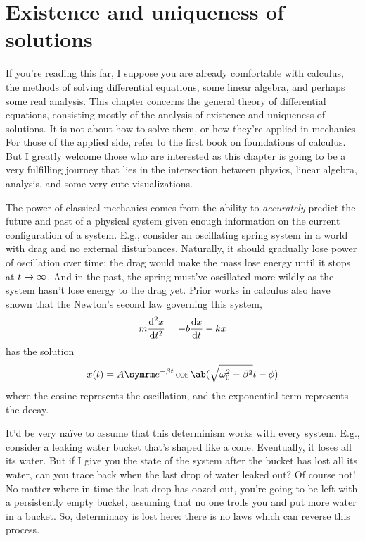 \chapter{Existence and uniqueness of solutions}


If you're reading this far, I suppose you are already comfortable with calculus, the
methods of solving differential equations, some linear algebra, and perhaps some
real analysis. This chapter concerns the general theory of differential equations,
consisting mostly of the analysis of existence and uniqueness of solutions. It is not
about how to solve them, or how they're applied in mechanics. For those of the applied
side, refer to the first book on foundations of calculus. But I greatly welcome those
who are interested as this chapter is going to be a very fulfilling journey that lies
in the intersection between physics, linear algebra, analysis, and some very cute visualizations.

The power of classical mechanics comes from the ability to \emph{accurately} predict the
future and past of a physical system given enough information on the current configuration
of a system. E.g., consider an oscillating spring system in a world with drag and no external
disturbances. Naturally, it should gradually lose power of oscillation over time; the
drag would make the mass lose energy until it stops at \(t \rightarrow \infty\). And in the
past, the spring must've oscillated more wildly as the system hasn't lose energy to the drag
yet. Prior works in calculus also have shown that the Newton's second law governing this system,
\begin{equation}
  m \odv[ord = 2]{x}{t} = - b \odv{x}{t} - kx
\end{equation}
has the solution
\begin{equation}
  x(t) = A \e^{-\beta t} \cos\ab(\sqrt{\omega_0^2 - \beta^2} t - \phi)
\end{equation}
where the cosine represents the oscillation, and the exponential term represents the decay.

It'd be very na\"ive to assume that this determinism works with every system. E.g., consider
a leaking water bucket that's shaped like a cone. Eventually, it loses all its water.
But if I give you the state of the system after the bucket has lost all its water, can
you trace back when the last drop of water leaked out? Of course not! No matter where
in time the last drop has oozed out, you're going to be left with a persistently empty
bucket, assuming that no one trolls you and put more water in a bucket. So, determinacy
is lost here: there is no laws which can reverse this process.

